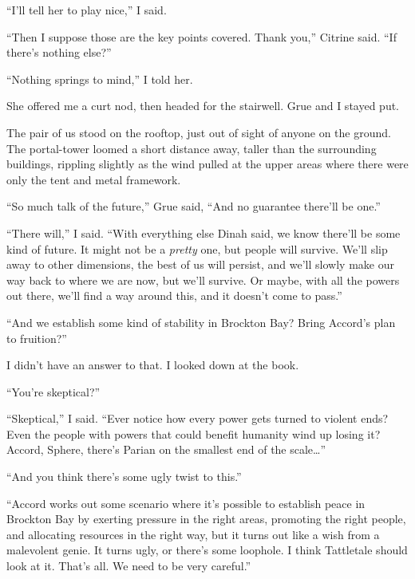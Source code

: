 ``I'll tell her to play nice,'' I said.



``Then I suppose those are the key points covered.  Thank you,'' Citrine said.  ``If there's nothing else?''



``Nothing springs to mind,'' I told her.



She offered me a curt nod, then headed for the stairwell.  Grue and I stayed put.



The pair of us stood on the rooftop, just out of sight of anyone on the ground.  The portal-tower loomed a short distance away, taller than the surrounding buildings, rippling slightly as the wind pulled at the upper areas where there were only the tent and metal framework.



``So much talk of the future,'' Grue said, ``And no guarantee there'll be one.''



``There will,'' I said.  ``With everything else Dinah said, we know there'll be some kind of future.  It might not be a \emph{pretty} one, but people will survive.  We'll slip away to other dimensions, the best of us will persist, and we'll slowly make our way back to where we are now, but we'll survive.  Or maybe, with all the powers out there, we'll find a way around this, and it doesn't come to pass.''



``And we establish some kind of stability in Brockton Bay?  Bring Accord's plan to fruition?''



I didn't have an answer to that.  I looked down at the book.



``You're skeptical?''



``Skeptical,'' I said.  ``Ever notice how every power gets turned to violent ends?  Even the people with powers that could benefit humanity wind up losing it?  Accord, Sphere, there's Parian on the smallest end of the scale\ldots''



``And you think there's some ugly twist to this.''



``Accord works out some scenario where it's possible to establish peace in Brockton Bay by exerting pressure in the right areas, promoting the right people, and allocating resources in the right way, but it turns out like a wish from a malevolent genie.  It turns ugly, or there's some loophole.  I think Tattletale should look at it.  That's all.  We need to be very careful.''



